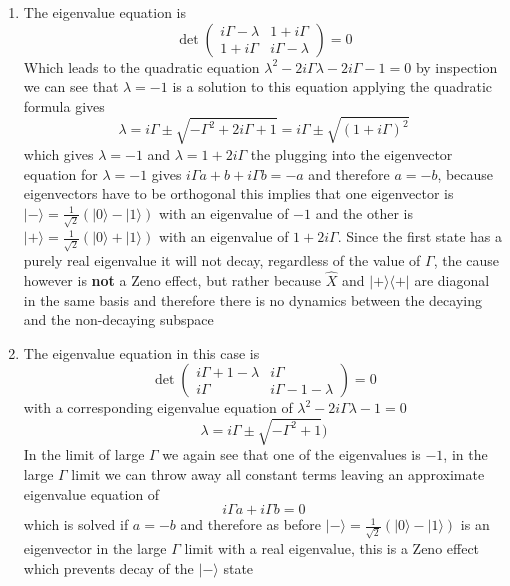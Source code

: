 \documentclass[english]{article}
\newcommand{\ket}[1]{|#1 \rangle}
\newcommand{\ketbra}[2]{\vert #1 \rangle \! \langle #2 \vert}
\begin{document}
\begin{enumerate}
\begin{enumerate}
\item The eigenvalue equation is 
\begin{equation}
\det\left(\begin{array}{cc}i \Gamma-\lambda & 1+i \Gamma \\ 1+ i \Gamma & i\Gamma-\lambda \end{array}\right)=0
\end{equation}
Which leads to the quadratic equation $\lambda^2-2i\Gamma \lambda-2 i\Gamma-1=0$ by inspection we can see that $\lambda=-1$ is a solution to this equation applying the quadratic formula gives
\begin{equation}
\lambda=i \Gamma \pm \sqrt{-\Gamma^2+2 i \Gamma+1}=i \Gamma \pm \sqrt{(1+i \Gamma)^2}
\end{equation}
which gives $\lambda=-1$ and $\lambda=1+2 i\Gamma$
the plugging into the eigenvector equation for $\lambda=-1$ gives $i \Gamma a+b+i \Gamma b=-a$ and therefore $a=-b$, because eigenvectors have to be orthogonal this implies  that one eigenvector is $\ket{-}=\frac{1}{\sqrt{2}}(\ket{0}-\ket{1})$ with an eigenvalue of $-1$ and the other is $\ket{+}=\frac{1}{\sqrt{2}}(\ket{0}+\ket{1})$ with an eigenvalue of $1+2 i \Gamma$.
Since the first state has a purely real eigenvalue it will not decay, regardless of the value of $\Gamma$, the cause however is \textbf{not} a Zeno effect, but rather because $\hat{X}$ and $\ketbra{+}{+}$ are diagonal in the same basis and therefore there is no dynamics between the decaying and the non-decaying subspace
\item The eigenvalue equation in this case is 
\begin{equation}
\det\left(\begin{array}{cc}i \Gamma+1-\lambda & i \Gamma \\ i \Gamma & i\Gamma-1-\lambda \end{array}\right)=0
\end{equation}
with a corresponding eigenvalue equation of $\lambda^2-2i\Gamma \lambda-1=0$
\begin{equation}
\lambda= i \Gamma \pm \sqrt{-\Gamma^2+1})
\end{equation}
In the limit of large $\Gamma$ we again see that one of the eigenvalues is $-1$,  in the large $\Gamma$ limit we can throw away all constant terms leaving an approximate eigenvalue equation of
\begin{equation}
i \Gamma a+i\Gamma b=0
\end{equation}
which is solved if $a=-b$ and therefore as before $\ket{-}=\frac{1}{\sqrt{2}}(\ket{0}-\ket{1})$ is an eigenvector in the large $\Gamma$ limit with a real eigenvalue, this is a Zeno effect which prevents decay of the $\ket{-}$ state

\end{enumerate}
\end{enumerate}
\end{document}
